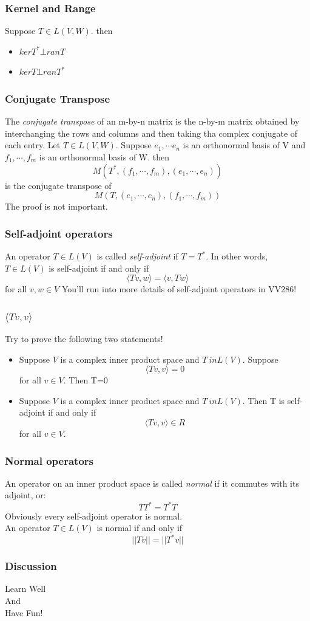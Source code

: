 \documentclass[12pt, t]{beamer}
\renewcommand{\emph}[1]{{\color{Turquoise3}\textsl{#1}}}
\newcommand{\nullspace}{~\\[15pt]}
\begin{document}
\begin{frame}
    \frametitle{Kernel and Range}
    Suppose $T\in L(V,W)$. then

    \begin{itemize}
        \item $ker T^{*} \bot ran T$
        \item $ker T \bot ran T^{*}$
    \end{itemize}

\end{frame}

\begin{frame}
    \frametitle{Conjugate Transpose}
    The \emph{conjugate transpose} of an m-by-n matrix is the n-by-m matrix obtained by interchanging the rows and columns and then taking tha complex conjugate of each entry.
    Let $T\in L(V,W)$. Suppose $e_1,\cdots e_n$ is an orthonormal basis of V and $f_1, \cdots , f_m$ is an orthonormal basis of W. then
    \[
    M(T^{*}, (f_1,\cdots,f_m), (e_1,\cdots,e_n))  
    \] 
    is the conjugate transpose of 
    \[
    M(T,(e_1,\cdots,e_n), (f_1,\cdots,f_m) )    
    \]
    The proof is not important.
\end{frame}

\begin{frame}
    \frametitle{Self-adjoint operators}
    An operator $T \in L(V)$ is called \emph{self-adjoint} if $T=T^{*}$. In other words, $T\in L(V)$ is self-adjoint if and only if 
    \[
    \langle Tv,w\rangle=\langle v,Tw\rangle    
    \]
    for all $v,w \in V$
    You'll run into more details of self-adjoint operators in VV286!
\end{frame}

\begin{frame}
    \frametitle{$\langle Tv,v \rangle$}
    Try to prove the following two statements!
    \begin{itemize}
        \item Suppose $V$ is a complex inner product space and $T\ in L(V)$. Suppose
        \[
        \langle Tv,v\rangle=0    
        \]
        for all $v \in V$. Then T=0
        \item Suppose $V$ is a complex inner product space and $T\ in L(V)$. Then T is self-adjoint if and only if
        \[
        \langle Tv,v\rangle \in R
        \]
        for all $v \in V$.
    \end{itemize}
\end{frame}

\begin{frame}
    \frametitle{Normal operators}
    An operator on an inner product space is called \emph{normal} if it commutes with its adjoint, or:
    \[
    TT^{*}=T^{*}T    
    \]
    Obviously every self-adjoint operator is normal.
    \nullspace
    An operator $T\in L(V)$ is normal if and only if 
    \[
    ||Tv||=||T^{*}v||    
    \]
\end{frame}

\begin{frame}
    \frametitle{Discussion}
    \vspace{1.5cm}
    \Large
    \centering
    Learn Well\\
    And\\
    Have Fun!\\


\end{frame}
\end{document}
